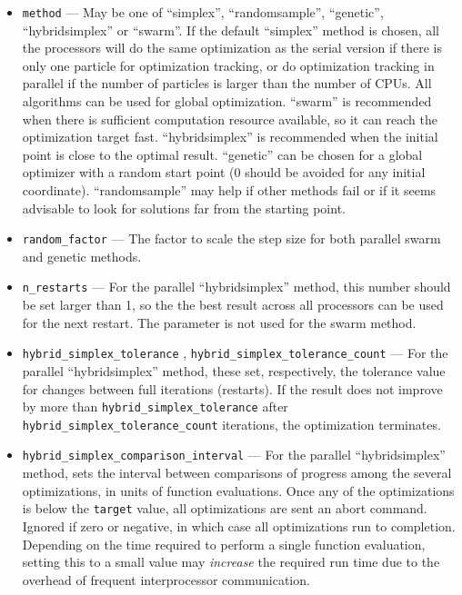 \documentclass[11pt]{article}
\begin{document}
\begin{itemize}
\item \verb|method| --- May be one of ``simplex'', ``randomsample'', ``genetic'', ``hybridsimplex'' or ``swarm''. If the
  default ``simplex'' method is chosen, all the processors will do the same optimization as the serial version if there
  is only one particle for optimization tracking, or do optimization tracking in parallel if the number of particles is
  larger than the number of CPUs. All algorithms can be used for global optimization. ``swarm'' is recommended when
  there is sufficient computation resource available, so it can reach the optimization target fast. ``hybridsimplex'' is
  recommended when the initial point is close to the optimal result. ``genetic'' can be chosen for a global optimizer
  with a random start point (0 should be avoided for any initial coordinate). ``randomsample'' may help if other methods
  fail or if it seems advisable to look for solutions far from the starting point.

\item \verb|random_factor| --- The factor to scale the step size for both parallel swarm and genetic methods.

\item \verb|n_restarts| --- For the parallel ``hybridsimplex'' method, this number should be set larger than 1, so the the best result across all processors can be used for the next restart. The parameter is not used for the swarm method.

\item \verb|hybrid_simplex_tolerance| , \verb|hybrid_simplex_tolerance_count| --- For the parallel ``hybridsimplex'' method,
  these set, respectively, the tolerance value for changes between full iterations (restarts). If the result does not improve by
  more than \verb|hybrid_simplex_tolerance| after \verb|hybrid_simplex_tolerance_count| iterations, the optimization terminates.

\item \verb|hybrid_simplex_comparison_interval| --- For the parallel ``hybridsimplex'' method, sets the interval between
  comparisons of progress among the several optimizations, in units of function evaluations. Once any of the optimizations
  is below the \verb|target| value, all optimizations are sent an abort command.
  Ignored if zero or negative, in which case all optimizations run to completion.
  Depending on the time required to perform a single function evaluation, setting this to a small value 
  may {\em increase} the required run time due to the overhead of frequent interprocessor communication.


\end{itemize}
\end{document}
